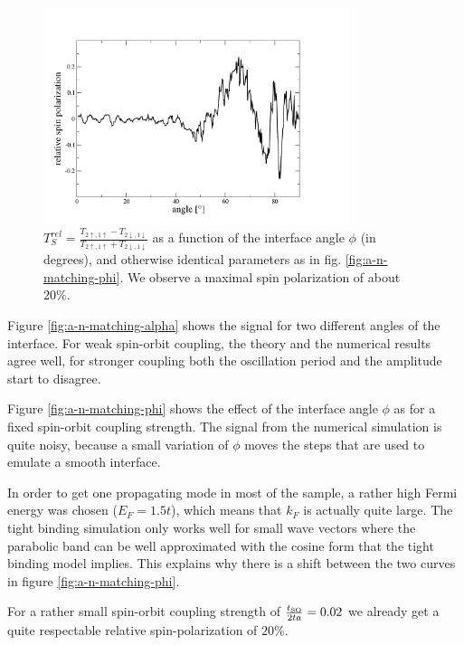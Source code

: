 \begin{figure}
    \begin{center}
        \includegraphics[width=0.8\textwidth]{relative-polarization-n-so.pdf}
    \end{center}
    \caption{$T_S^{rel} = \frac{T_{2\uparrow,1\uparrow} - T_{2\downarrow,1\downarrow}}
        {T_{2\uparrow,1\uparrow} + T_{2\downarrow,1\downarrow}}$ as
        a function of the interface angle $\phi$ (in degrees), and otherwise
        identical parameters as in fig. \ref{fig:a-n-matching-phi}.
        We observe a maximal spin polarization of about $20\%$.
        }
    \label{fig:n-so-rel}
\end{figure}

Figure \ref{fig:a-n-matching-alpha} shows the signal for two different
angles of the interface. For weak spin-orbit coupling, the theory and the
numerical results agree well, for stronger coupling both the oscillation
period and the amplitude start to disagree.

Figure \ref{fig:a-n-matching-phi} shows the effect of the interface angle
$\phi$ as for a fixed spin-orbit coupling strength. The signal from the
numerical simulation is quite noisy, because
a small variation of $\phi$ moves the steps that are used to emulate a smooth
interface.

In order to get one propagating mode in most of the sample, a rather
high Fermi energy was chosen ($E_F = 1.5t$), which means that $k_F$ is
actually quite large. The tight binding simulation only works well for small
wave vectors where the parabolic band can be well approximated with the
cosine form that the tight binding model implies. This explains why there is a
shift between the two curves in figure \ref{fig:a-n-matching-phi}.

For a rather small spin-orbit coupling strength of $\frac{t_{\textnormal{SO}}}{2 t a} = 0.02$
we already get a quite respectable relative spin-polarization of $20\%$.

